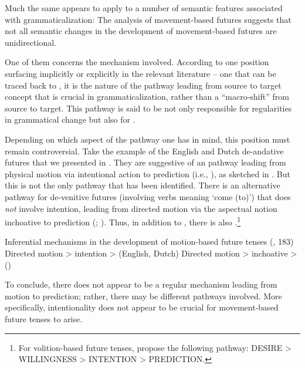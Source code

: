 \documentclass[output=paper]{langsci/langscibook}
\begin{document}
Much the same appears to apply to a number of semantic features associated with grammaticalization: The analysis of movement-based futures suggests that not all semantic changes in the development of movement-based futures are unidirectional.



One of them concerns the  mechanism involved. According to one position surfacing implicitly or explicitly in the relevant literature -- one that can be traced back to \citet{BybeeEtAl1994}, it is the nature of the  pathway leading from source to target concept that is crucial in grammaticalization, rather than a “macro-shift” from source to target. This pathway is said to be not only responsible for regularities in grammatical change but also for  \citep[268]{BybeeEtAl1994}.



  Depending on which aspect of the pathway one has in mind, this position must remain controversial. Take the example of the English and Dutch de-andative futures that we presented in . They are suggestive of an  pathway leading from physical motion via intentional action to prediction (i.e., ), as sketched in . But this is not the only pathway that has been identified. There is an alternative pathway for de-venitive futures (involving verbs meaning ‘come (to)’) that does \textit{not} involve intention, leading from directed motion via the aspectual notion inchoative to prediction (\citealt[322]{Dahl2000}; \citealt[126]{Hilpert2008}). Thus, in addition to , there is also .\footnote{For volition-based future tenses, \citet[256]{BybeeEtAl1994} propose the following pathway: DESIRE > WILLINGNESS > INTENTION > PREDICTION.
} 



\ea%
    \label{ex:heine:15}
  Inferential mechanisms in the development of motion-based  future tenses (\citealt[126]{Hilpert2008}, 183)
\ea \label{ex:heine:15a} Directed motion > intention >     (English, Dutch)
\ex \label{ex:heine:15b} Directed motion > inchoative >    ()
\z
\z


To conclude, there does not appear to be a regular  mechanism leading from motion to prediction; rather, there may be different pathways involved. More specifically, intentionality does not appear to be crucial for movement-based future tenses to arise.
\end{document}
